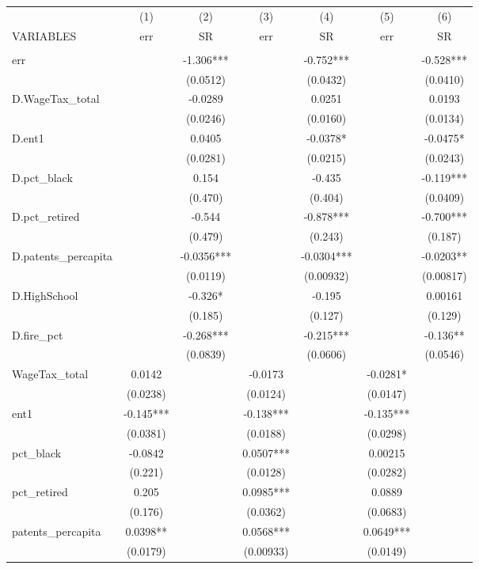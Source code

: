 \begin{tabular}{lcccccc} \hline
 & (1) & (2) & (3) & (4) & (5) & (6) \\
VARIABLES & err & SR & err & SR & err & SR \\ \hline
 &  &  &  &  &  &  \\
err &  & -1.306*** &  & -0.752*** &  & -0.528*** \\
 &  & (0.0512) &  & (0.0432) &  & (0.0410) \\
D.WageTax\_total &  & -0.0289 &  & 0.0251 &  & 0.0193 \\
 &  & (0.0246) &  & (0.0160) &  & (0.0134) \\
D.ent1 &  & 0.0405 &  & -0.0378* &  & -0.0475* \\
 &  & (0.0281) &  & (0.0215) &  & (0.0243) \\
D.pct\_black &  & 0.154 &  & -0.435 &  & -0.119*** \\
 &  & (0.470) &  & (0.404) &  & (0.0409) \\
D.pct\_retired &  & -0.544 &  & -0.878*** &  & -0.700*** \\
 &  & (0.479) &  & (0.243) &  & (0.187) \\
D.patents\_percapita &  & -0.0356*** &  & -0.0304*** &  & -0.0203** \\
 &  & (0.0119) &  & (0.00932) &  & (0.00817) \\
D.HighSchool &  & -0.326* &  & -0.195 &  & 0.00161 \\
 &  & (0.185) &  & (0.127) &  & (0.129) \\
D.fire\_pct &  & -0.268*** &  & -0.215*** &  & -0.136** \\
 &  & (0.0839) &  & (0.0606) &  & (0.0546) \\
WageTax\_total & 0.0142 &  & -0.0173 &  & -0.0281* &  \\
 & (0.0238) &  & (0.0124) &  & (0.0147) &  \\
ent1 & -0.145*** &  & -0.138*** &  & -0.135*** &  \\
 & (0.0381) &  & (0.0188) &  & (0.0298) &  \\
pct\_black & -0.0842 &  & 0.0507*** &  & 0.00215 &  \\
 & (0.221) &  & (0.0128) &  & (0.0282) &  \\
pct\_retired & 0.205 &  & 0.0985*** &  & 0.0889 &  \\
 & (0.176) &  & (0.0362) &  & (0.0683) &  \\
patents\_percapita & 0.0398** &  & 0.0568*** &  & 0.0649*** &  \\
 & (0.0179) &  & (0.00933) &  & (0.0149) &  \\

\end{tabular}
